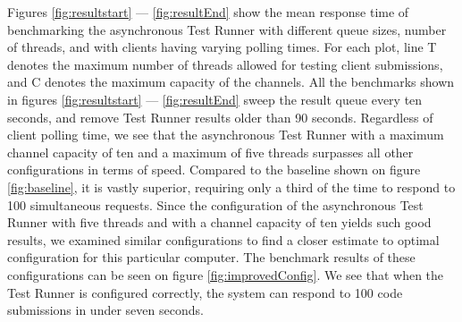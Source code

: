 Figures \ref{fig:resultstart} --- \ref{fig:resultEnd} show the mean response time of benchmarking the asynchronous Test Runner with different queue sizes, number of threads, and with clients having varying polling times.
For each plot, line T denotes the maximum number of threads allowed for testing client submissions, and C denotes the maximum capacity of the channels.
All the benchmarks shown in figures \ref{fig:resultstart} --- \ref{fig:resultEnd} sweep the result queue every ten seconds, and remove Test Runner results older than 90 seconds.
Regardless of client polling time, we see that the asynchronous Test Runner with a maximum channel capacity of ten and a maximum of five threads surpasses all other configurations in terms of speed.
Compared to the baseline shown on figure \ref{fig:baseline}, it is vastly superior, requiring only a third of the time to respond to 100 simultaneous requests.
Since the configuration of the asynchronous Test Runner with five threads and with a channel capacity of ten yields such good results, we examined similar configurations to find a closer estimate to optimal configuration for this particular computer.
The benchmark results of these configurations can be seen on figure \ref{fig:improvedConfig}.
We see that when the Test Runner is configured correctly, the system can respond to 100 code submissions in under seven seconds.

